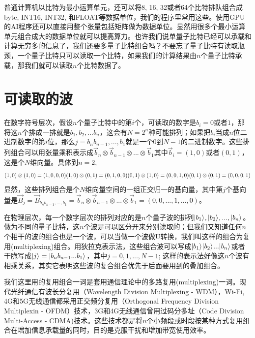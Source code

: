 \documentclass{ctexbook}
\begin{document}
普通计算机以比特为最小运算单元，还可以将8, 16, 32或者64个比特排队组合成byte, INT16, INT32, 和FLOAT等数据单位，我们的程序里常用这些。使用GPU的AI程序还可以直接用整个张量包括矩阵做为数据单位。显然用很多个最小运算单元组合成大的数据单位就可以提高算力。也许我们说单量子比特已经可以承载和计算无穷多的信息了，我们还要多量子比特组合吗？不要忘了量子比特有读取瓶颈，一个量子比特只可以读取一个比特，如果我们的计算结果由$n$个量子比特承载，那我们就可以读取$n$个比特数据了。

\section{可读取的波}
在数字符号层次，假设$n$个量子比特中的第$i$个，可读取的数字是$b_i=0$或者$1$，那将这$n$个排成一排就是${b_1, b_2, ...b_n}$，这会有$N=2^n$种可能排列；如果把$b_i$当成$n$位二进制数字的第$i$位，那么$j = b_n b_{n-1}, ..., b_1$就是一个0到$N-1$的二进制数字。这些排列组合可以用张量乘积表示成${\vec b}_n \otimes {\vec b}_{n-1}  \otimes ... \otimes {\vec b}_1$其中${\vec b}_i = (1, 0)或者(0, 1)$，这是个$N$维向量。具体到$n=2$,
\begin{equation}
    (1, 0) \otimes (1, 0) = (1, 0, 0, 0) \\
    (1, 0) \otimes (0, 1) = (0, 1, 0, 0) \\
    (0, 1) \otimes (1, 0) = (0, 0, 1, 0) \\
    (0, 1) \otimes (0, 1) = (0, 0, 0, 1)
\end{equation}
显然，这些排列组合是个$N$维向量空间的一组正交归一的基向量，其中第$j$个基向量是${\vec B}_j = {\vec B}_{b_n b_{n-1}, ..., b_1} = {\vec b}_n \otimes {\vec b}_{n-1}  \otimes ... \otimes {\vec b}_1 = (0, 0, ..., 1, ..., 0)$。

在物理层次，每一个数字层次的排列对应的是$n$个量子波的排列$\vert {b_1} \rangle_{}, \vert {b_2} \rangle_{}, ..., \vert {b_n} \rangle_{} $。做为不同的量子比特，这$n$个波是可以区分开来分别读取的；但我们又知道任何$n$个相干的波的组合也是一个波，可以当做一个波做U转换，我们叫这样的组合为复用(multiplexing)组合。用狄拉克表示法，这些组合波可以写成$\vert {b_1} \rangle_{} \vert {b_2} \rangle_{} ... \vert {b_n} \rangle_{}$或者干脆写成$\vert {j} \rangle_{} = \vert {b_n b_{n-1} ... b_1} \rangle_{}$，其中$j=0, 1, ..., N-1$; 这样的表示法好像这$n$个波有相乘关系，其实它表明这些波的复合组合优先于后面要用到的叠加组合。

我们这里用的复用组合一词是套用通信理论中的多路复用(multiplexing)一词。现代光纤通信有波长分复用（Wavelength Division Multiplexing - WDM），Wi-Fi, 4G和5G无线通信都采用正交频分复用（Orthogonal Frequency Division Multiplexin - OFDM）技术，3G和4G无线通信曾用过码分多址（Code Division Multi-Access - CDMA)技术。这些技术都是将$n$个小频段或时段按某种方式复用组合在增加信息承载量的同时，目的是克服干扰和增加带宽使用效率。
\end{document}
